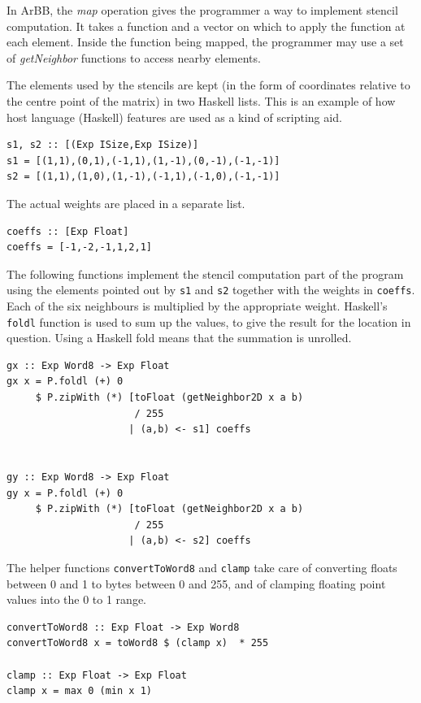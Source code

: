 In ArBB, the {\em map} operation gives the programmer a way to implement stencil computation. 
It takes a function and a vector on which to apply the function at each element. 
Inside the function being mapped, the programmer may use a set of {\em getNeighbor} functions 
to access nearby elements. 

The elements used by the stencils are kept (in the form of
coordinates relative to the centre point of the matrix) in two Haskell lists. This is an 
example of how host language (Haskell) features are used as a kind of 
scripting aid. 

\begin{verbatim} 
s1, s2 :: [(Exp ISize,Exp ISize)]
s1 = [(1,1),(0,1),(-1,1),(1,-1),(0,-1),(-1,-1)]
s2 = [(1,1),(1,0),(1,-1),(-1,1),(-1,0),(-1,-1)]
\end{verbatim} 

The actual weights are placed in a separate list. 

\begin{verbatim} 
coeffs :: [Exp Float] 
coeffs = [-1,-2,-1,1,2,1] 
\end{verbatim}

The following functions implement the stencil computation part of the program
using the elements pointed out by {\tt s1} and {\tt s2} together with  the weights in {\tt coeffs}. 
Each of the six neighbours is multiplied by the appropriate weight. 
Haskell's {\tt foldl} function is used to sum up the values, to
give the result for the location in question. Using a Haskell fold means that the 
summation is unrolled. 

\begin{verbatim}
gx :: Exp Word8 -> Exp Float  
gx x = P.foldl (+) 0 
     $ P.zipWith (*) [toFloat (getNeighbor2D x a b) 
                      / 255 
                     | (a,b) <- s1] coeffs 


gy :: Exp Word8 -> Exp Float 
gy x = P.foldl (+) 0 
     $ P.zipWith (*) [toFloat (getNeighbor2D x a b) 
                      / 255
                     | (a,b) <- s2] coeffs 
\end{verbatim}

The helper functions {\tt convertToWord8} and {\tt clamp} take 
care of converting floats between 0 and 1 to bytes between 0 and 255, and 
of clamping floating point values into the 0 to 1 range. 

\begin{verbatim}
convertToWord8 :: Exp Float -> Exp Word8 
convertToWord8 x = toWord8 $ (clamp x)  * 255

clamp :: Exp Float -> Exp Float
clamp x = max 0 (min x 1)  
\end{verbatim}

